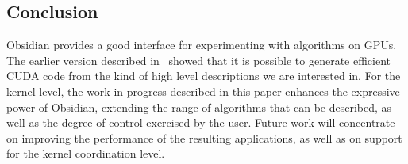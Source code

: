 
\subsection{Conclusion} \label{sec:conc}

Obsidian provides a good interface for experimenting with algorithms on GPUs. 
The earlier version described in~ showed that it is possible to 
generate efficient CUDA code from the kind of high level descriptions we are 
interested in. For the kernel level, the work in progress described in this paper enhances the  expressive power of Obsidian, extending the range of algorithms that can be described, as well as the degree of control exercised by the user. 
Future work will concentrate on improving the performance of the resulting 
applications, as well as on support for the kernel coordination level.
